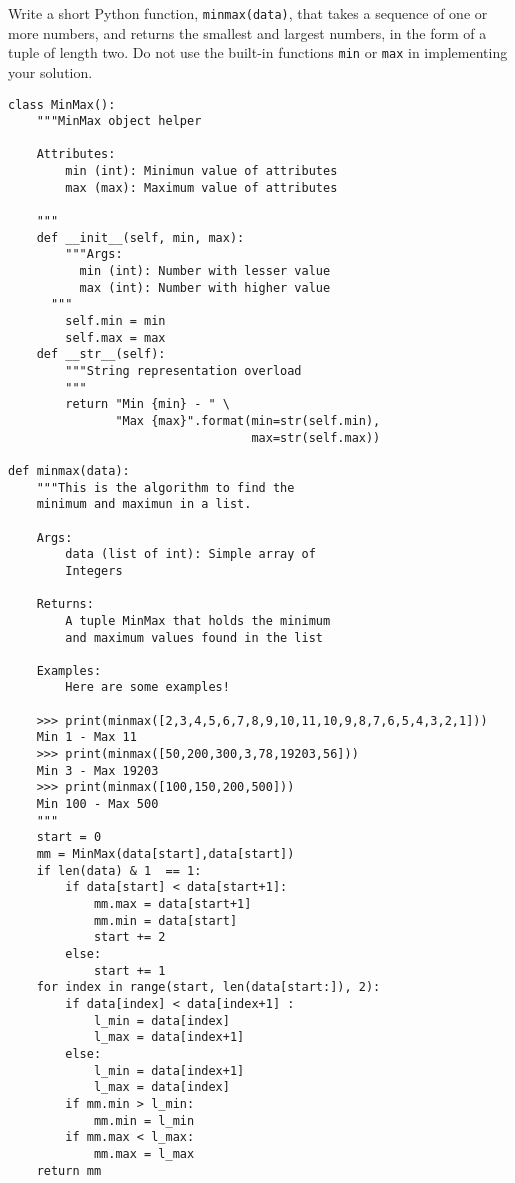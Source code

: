  \label{sssec:ex1_3}

Write a short Python function, \texttt{minmax(data)}, that takes a sequence of one or more numbers, and returns the smallest and largest numbers, in the form of a tuple of length two. Do not use the built-in functions \texttt{min} or \texttt{max} in implementing your solution.

\begin{lstlisting}[title=Exercise R-1.3]
class MinMax():
    """MinMax object helper

    Attributes:
        min (int): Minimun value of attributes
        max (max): Maximum value of attributes

    """
    def __init__(self, min, max):
        """Args:
          min (int): Number with lesser value
          max (int): Number with higher value
      """
        self.min = min
        self.max = max
    def __str__(self):
        """String representation overload
        """
        return "Min {min} - " \
               "Max {max}".format(min=str(self.min),
                                  max=str(self.max))

def minmax(data):
    """This is the algorithm to find the
    minimum and maximun in a list.

    Args:
        data (list of int): Simple array of
        Integers

    Returns:
        A tuple MinMax that holds the minimum
        and maximum values found in the list

    Examples:
        Here are some examples!

    >>> print(minmax([2,3,4,5,6,7,8,9,10,11,10,9,8,7,6,5,4,3,2,1]))
    Min 1 - Max 11
    >>> print(minmax([50,200,300,3,78,19203,56]))
    Min 3 - Max 19203
    >>> print(minmax([100,150,200,500]))
    Min 100 - Max 500
    """
    start = 0
    mm = MinMax(data[start],data[start])
    if len(data) & 1  == 1:
        if data[start] < data[start+1]:
            mm.max = data[start+1]
            mm.min = data[start]
            start += 2
        else:
            start += 1
    for index in range(start, len(data[start:]), 2):
        if data[index] < data[index+1] :
            l_min = data[index]
            l_max = data[index+1]
        else:
            l_min = data[index+1]
            l_max = data[index]
        if mm.min > l_min:
            mm.min = l_min
        if mm.max < l_max:
            mm.max = l_max
    return mm
\end{lstlisting}

